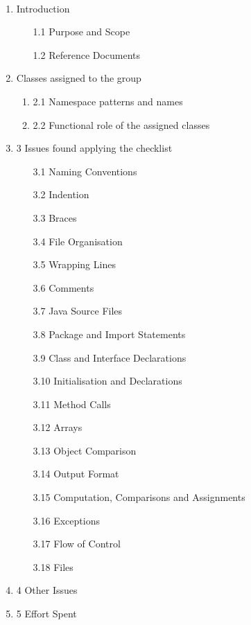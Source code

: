 \documentclass{article}
\begin{document}
 \\    %
\begin{enumerate}

\item Introduction




\begin {enumerate}

\item [1.1] Purpose and Scope
\item [1.2] Reference Documents


\end{enumerate}

\item Classes assigned to the group


\begin {enumerate}
\item [2.1] Namespace patterns and names

\item [2.2] Functional role of the assigned classes



\end {enumerate} 




\item[3] Issues found applying the checklist
\begin{enumerate}
\item [3.1] Naming Conventions
\item [3.2] Indention
\item [3.3] Braces
\item [3.4] File Organisation
\item [3.5] Wrapping Lines
\item [3.6] Comments
\item [3.7] Java Source Files
\item [3.8] Package and Import Statements
\item [3.9] Class and Interface Declarations
\item [3.10] Initialisation and Declarations
\item [3.11] Method Calls
\item [3.12] Arrays
\item [3.13] Object Comparison
\item [3.14] Output Format
\item [3.15] Computation, Comparisons and Assignments
\item [3.16] Exceptions
\item [3.17] Flow of Control
\item [3.18] Files

\end{enumerate}



\item[4] Other Issues 



\item[5] Effort Spent






\end{enumerate}
\end{document}
